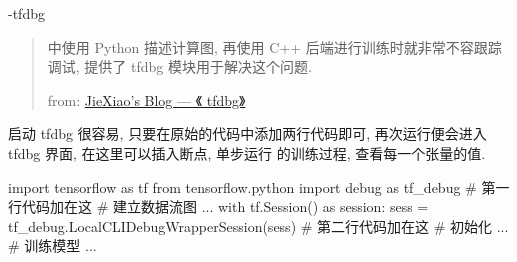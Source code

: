 \begin{frame}[fragile]{\insertsection}{\insertsubsection-tfdbg}
\begin{quote}
\tensorflow{} 中使用 Python 描述计算图, 再使用 C++ 后端进行训练时就非常不容跟踪调试, \tensorflow{} 提供了 tfdbg 模块用于解决这个问题.

\hfill from: \href{https://jiexiao111.github.io/2017/10/17/Tensorflow-tfdbg.html}{JieXiao's Blog --- 《\tensorflow{} tfdbg》}
\end{quote}

\pause
启动 tfdbg 很容易, 只要在原始的代码中添加两行代码即可, 再次运行便会进入 tfdbg 界面, 在这里可以插入断点, 单步运行 \tensorflow{} 的训练过程, 查看每一个张量的值.
\begin{pythoncode}[fontsize = \fontsize{8}{8}\selectfont]
import tensorflow as tf
from tensorflow.python import debug as tf_debug # 第一行代码加在这
# 建立数据流图 ...
with tf.Session() as session:
  sess = tf_debug.LocalCLIDebugWrapperSession(sess) # 第二行代码加在这
  # 初始化 ...
  # 训练模型 ...
\end{pythoncode}

\end{frame}





